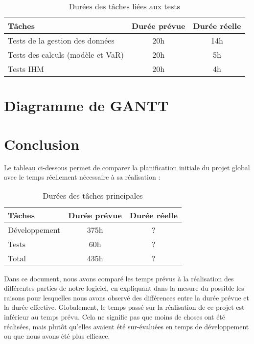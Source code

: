 \documentclass[a4paper]{report}
\begin{document}
\begin{table}[H]
\centering
  \begin{tabularx}{0.8\textwidth}{| X | c | c |}
    \hline
	Tâches & Durée prévue & Durée réelle \\
    \hline
    Tests de la gestion des données & 20h & 14h\\
    Tests des calculs (modèle et VaR) & 20h & 5h\\
    Tests IHM & 20h & 4h\\
    \hline
  \end{tabularx}
  \caption{Durées des tâches liées aux tests}
\end{table}


\chapter{Diagramme de GANTT}


\chapter{Conclusion}

Le tableau ci-dessous permet de comparer la planification initiale du projet global avec le temps réellement nécessaire à sa réalisation :

\begin{table}[H]
\centering
  \begin{tabularx}{0.8\textwidth}{| X | c | c |}
    \hline
	Tâches & Durée prévue & Durée réelle \\
    \hline
    Développement & 375h & ?\\
    Tests & 60h & ?\\
    \hline
	Total & 435h & ?\\
    \hline
  \end{tabularx}
  \caption{Durées des tâches principales}
\end{table}

Dans ce document, nous avons comparé les temps prévus à la réalisation des différentes parties de notre logiciel, en expliquant dans la mesure du possible les raisons pour lesquelles nous avons observé des différences entre la durée prévue et la durée effective.
Globalement, le temps passé sur la réalisation de ce projet est inférieur au temps prévu. Cela ne signifie pas que moins de choses ont été réalisées, mais plutôt qu'elles avaient été sur-évaluées en temps de développement ou que nous avons été plus efficace.
\end{document}
